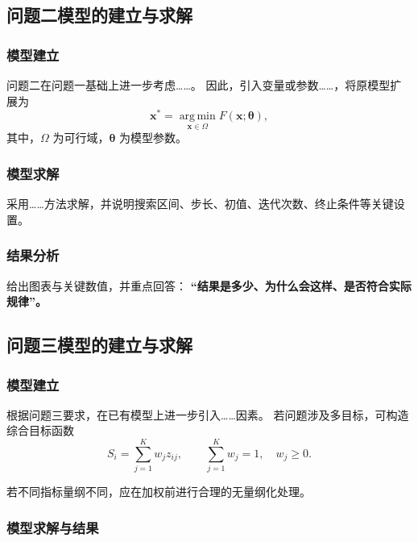 \documentclass[UTF8,fontset=none,a4paper,12pt]{ctexart}
\newcommand{\argmin}{\operatorname*{arg\,min}}
\begin{document}
\subsection{问题二模型的建立与求解}

\subsubsection{模型建立}

问题二在问题一基础上进一步考虑……。
因此，引入变量或参数……，将原模型扩展为
\begin{equation}
  \bm{x}^{*}
  = \argmin_{\bm{x}\in\Omega}F(\bm{x};\bm{\theta}),
  \label{eq:q2-model}
\end{equation}
其中，$\Omega$ 为可行域，$\bm{\theta}$ 为模型参数。

\subsubsection{模型求解}

采用……方法求解，并说明搜索区间、步长、初值、迭代次数、终止条件等关键设置。

\subsubsection{结果分析}

给出图表与关键数值，并重点回答：
\textbf{“结果是多少、为什么会这样、是否符合实际规律”。}

\subsection{问题三模型的建立与求解}

\subsubsection{模型建立}

根据问题三要求，在已有模型上进一步引入……因素。
若问题涉及多目标，可构造综合目标函数
\begin{equation}
  S_i=\sum_{j=1}^{K}w_jz_{ij},
  \qquad
  \sum_{j=1}^{K}w_j=1,\quad w_j\ge 0.
  \label{eq:q3-score}
\end{equation}

若不同指标量纲不同，应在加权前进行合理的无量纲化处理。

\subsubsection{模型求解与结果}
\end{document}

